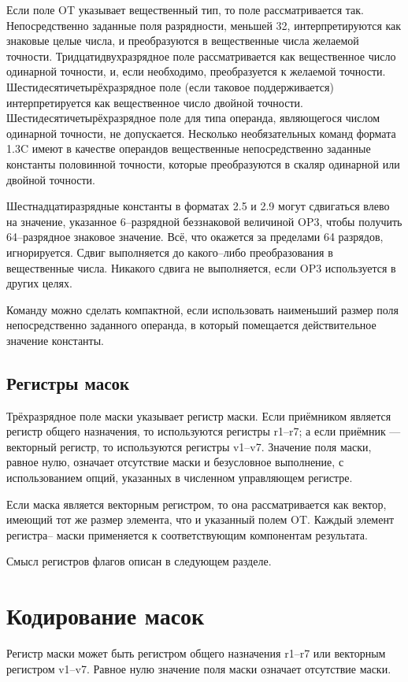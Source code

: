\documentclass[forwardcom.tex]{subfiles}
\begin{document}
Если поле OT указывает вещественный тип, то поле рассматривается так. Непосредственно заданные поля разрядности, меньшей 32, интерпретируются как знаковые целые числа, и преобразуются в вещественные числа желаемой точности. Тридцатидвухразрядное поле рассматривается как вещественное число одинарной точности, и, если необходимо, преобразуется к желаемой точности. Шестидесятичетырёхразрядное поле (если таковое поддерживается) интерпретируется как вещественное число двойной точности. Шестидесятичетырёхразрядное поле для типа операнда, являющегося числом одинарной точности, не допускается. Несколько необязательных команд формата 1.3C имеют в качестве операндов вещественные непосредственно заданные константы половинной точности, которые преобразуются в скаляр одинарной или двойной точности.

Шестнадцатиразрядные константы в форматах 2.5 и 2.9 могут сдвигаться влево на значение, указанное 6--разрядной беззнаковой величиной OP3, чтобы получить 64--разрядное знаковое значение. Всё, что окажется за пределами 64 разрядов, игнорируется. Сдвиг выполняется до какого--либо преобразования в вещественные числа. Никакого сдвига не выполняется, если OP3 используется в других целях.

Команду можно сделать компактной, если использовать наименьший размер поля непосредственно заданного операнда, в который помещается действительное значение константы.

\subsection{Регистры масок}
Трёхразрядное поле маски указывает регистр маски. Если приёмником является регистр общего назначения, то используются регистры r1--r7; а если приёмник --- векторный регистр, то используются регистры v1--v7. Значение поля маски, равное нулю, означает отсутствие маски и безусловное выполнение, с использованием опций, указанных в численном управляющем регистре.

Если маска является векторным регистром, то она рассматривается как вектор, имеющий тот же размер элемента, что и указанный полем OT. Каждый элемент регистра-- маски применяется к соответствующим компонентам результата.

Смысл регистров флагов описан в следующем разделе.

\section{Кодирование масок}
Регистр маски может быть регистром общего назначения r1--r7 или векторным регистром v1--v7. Равное нулю значение поля маски означает отсутствие маски.
\end{document}
